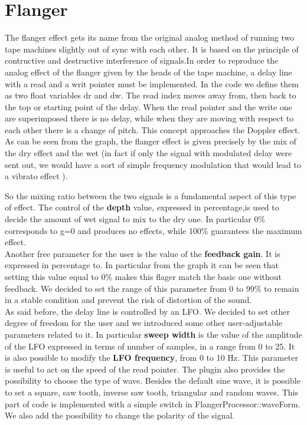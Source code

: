 \section{Flanger}
The flanger effect gets its name from the original analog method of running two tape machines slightly out of sync with each other. It is based on the principle of contructive and destructive interference of signals.In order to reproduce the analog effect of the flanger given by the heads of the tape machine, a delay line with a read and a writ pointer must be implemented. In the code we define them as two float variables dr and dw. The read index moves away from, then back to the top or starting point of the delay. When the read pointer and the write one are superimposed there is no delay, while when they are moving with respect to each other there is a change of pitch. This concept approaches the Doppler effect. As can be seen from the graph, the flanger effect is given precisely by the mix of the dry effect and the wet (in fact if only the signal with modulated delay were sent out, we would have a sort of simple frequency modulation that would lead to a vibrato effect ).\par
So the mixing ratio between the two signals is a fundamental aspect of this type of effect. The control of the \textbf{depth} value, expressed in percentage,is used to decide the amount of wet signal to mix to the dry one. In particular 0\% corresponds to g=0 and produces no effects, while 100\% guarantees the maximum effect.\\
Another free parameter for the user is the value of the \textbf{feedback gain}. It is expressed in percentage to. In particular from the graph it can be seen that setting this value equal to 0\% makes this flager match the basic one without feedback. We decided to set the range of this parameter from 0 to 99\% to remain in a stable condition and prevent the risk of distortion of the sound.\\
As said before, the delay line is controlled by an LFO. We decided to set other degree of freedom for the user and we introduced some other user-adjustable parameters related to it. In particular \textbf{sweep width} is the value of the amplitude of the LFO expressed in terms of number of samples, in a range from  0 to 25. It is also possible to modify the \textbf{LFO frequency}, from 0 to 10 Hz. This parameter is useful to act on the speed of the read pointer. The plugin also provides the possibility to choose the type of wave. Besides the default sine wave, it is possible to set a square, saw tooth, inverse saw tooth, triangular and random waves. This part of code is implemented with a simple switch in FlangerProcessor::waveForm.
We also add the possibility to change the polarity of the signal.



